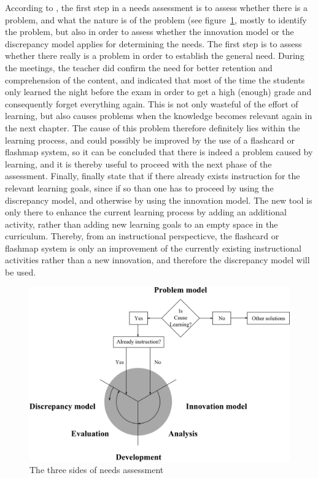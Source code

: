 According to , the first step in a needs assessment is to assess whether there is a problem, and what the nature is of the problem (see figure~\ref{fig:needsassessment}, mostly to identify the problem, but also in order to assess whether the innovation model or the discrepancy model applies for determining the needs. The first step is to assess whether there really is a problem in order to establish the general need. During the meetings, the teacher did confirm the need for better retention and comprehension of the content, and indicated that most of the time the students only learned the night before the exam in order to get a high (enough) grade and consequently forget everything again. This is not only wasteful of the effort of learning, but also causes problems when the knowledge becomes relevant again in the next chapter. The cause of this problem therefore definitely lies within the learning process, and could possibly be improved by the use of a flashcard or flashmap system, so it can be concluded that there is indeed a problem caused by learning, and it is thereby useful to proceed with the next phase of the assessment. Finally,  finally state that if there already exists instruction for the relevant learning goals, since if so than one has to proceed by using the discrepancy model, and otherwise by using the innovation model. The new tool is only there to enhance the current learning process by adding an additional activity, rather than adding new learning goals to an empty space in the curriculum. Thereby, from an instructional perspecticve, the flashcard or flashmap system is only an improvement of the currently existing instructional activities rather than a new innovation, and therefore the discrepancy model will be used.

\begin{figure}
    \centering
    \includegraphics[width=\textwidth]{img/needsassessment.png}
    \caption{The three sides of needs assessment \protect\cite{instructionaldesign}}
    \label{fig:needsassessment}
\end{figure}

